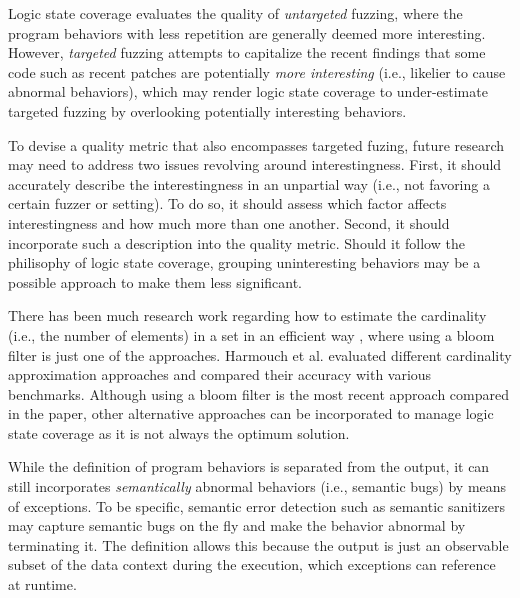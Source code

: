 \documentclass[letterpaper,twocolumn,10pt]{article}
\begin{document}
%
Logic state coverage evaluates the quality of \emph{untargeted} fuzzing, where
the program behaviors with less repetition are generally deemed more
interesting. 
%
However, \emph{targeted} fuzzing
\cite{aflchurn,chen2020savior,osterlund2020parmesan,lee2024syzrisk} attempts to
capitalize the recent findings \cite{aflchurn,zhai2022ndss,nikolaos2022longvuln}
that some code such as recent patches are potentially \emph{more interesting}
(i.e., likelier to cause abnormal behaviors), which may render logic state
coverage to under-estimate targeted fuzzing by overlooking potentially
interesting behaviors.

To devise a quality metric that also encompasses targeted fuzing, future
research may need to address two issues revolving around interestingness. First,
it should accurately describe the interestingness in an unpartial way (i.e., not
favoring a certain fuzzer or setting). To do so, it should assess which factor
affects interestingness and how much more than one another. Second, it should
incorporate such a description into the quality metric. Should it follow the
philisophy of logic state coverage, grouping uninteresting behaviors may be a
possible approach to make them less significant.


%
There has been much research work regarding how to estimate the cardinality
(i.e., the number of elements) in a set in an efficient way
\cite{papapetrou2010cardinality,harmouch2017cardinality}, where using a bloom
filter is just one of the approaches. Harmouch et al.
\cite{harmouch2017cardinality} evaluated different cardinality approximation
approaches and compared their accuracy with various benchmarks.  Although using
a bloom filter is the most recent approach compared in the paper, other
alternative approaches can be incorporated to manage logic state coverage as it
is not always the optimum solution.


%
While the definition of program behaviors is separated from the output, it can
still incorporates \emph{semantically} abnormal behaviors (i.e., semantic bugs)
by means of exceptions. To be specific, semantic error detection such as
semantic sanitizers \cite{kim2019hydra,yun2016apisan} may capture semantic bugs
on the fly and make the behavior abnormal by terminating it. The definition
allows this because the output is just an observable subset of the data context
during the execution, which exceptions can reference at runtime.
\end{document}
